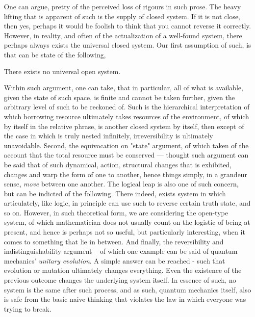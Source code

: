 One can argue, pretty of the perceived loss of rigours in such prose. The heavy lifting that is apparent of such is the supply of closed system. If it is not close, then yes, perhaps it would be foolish to think that you cannot reverse it correctly. However, in reality, and often of the actualization of a well-found system, there perhaps always exists the universal closed system. Our first assumption of such, is that can be state of the following,

\begin{assumption}
    There exists no universal open system. 
\end{assumption}
Within such argument, one can take, that in particular, all of what is available, given the state of such space, is finite and cannot be taken further, given the arbitrary level of such to be reckoned of. Such is the hierarchical interpretation of which borrowing resource ultimately takes resources of the environment, of which by itself in the relative phrase, is another closed system by itself, then except of the case in which is truly nested infinitely, irreversibility is ultimately unavoidable. Second, the equivocation on "state" argument, of which taken of the account that the total resource must be conserved --- thought such argument can be said that of such dynamical, action, structural changes that is exhibited, changes and warp the form of one to another, hence things simply, in a grandeur sense, \textit{move} between one another. The logical leap is also one of such concern, but can be indicted of the following. There indeed, exists system in which articulately, like logic, in principle can use such to reverse certain truth state, and so on. However, in such theoretical form, we are considering the open-type system, of which mathematician does not usually count on the logistic of being at present, and hence is perhaps not so useful, but particularly interesting, when it comes to something that lie in between. And finally, the reversibility and indistinguishability argument -- of which one example can be said of quantum mechanics' \textit{unitary evolution}. A simple answer can be reached - such that evolution or mutation ultimately changes everything. Even the existence of the previous outcome changes the underlying system itself. In essence of such, no system is the same after such process, and as such, quantum mechanics itself, also is safe from the basic naive thinking that violates the law in which everyone was trying to break. 


